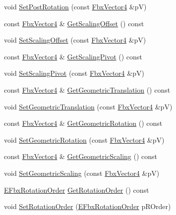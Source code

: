 \begin{DoxyCompactItemize}
void \hyperlink{class_fbx_node_1_1_pivot_a0f017a949fa3460ee06910443c808bbc}{Set\+Post\+Rotation} (const \hyperlink{class_fbx_vector4}{Fbx\+Vector4} \&pV)
\item 
const \hyperlink{class_fbx_vector4}{Fbx\+Vector4} \& \hyperlink{class_fbx_node_1_1_pivot_a9822cb96fdceb2b02e6ac9ba721ceb5c}{Get\+Scaling\+Offset} () const
\item 
void \hyperlink{class_fbx_node_1_1_pivot_a273362006b888000b93d209560b625ff}{Set\+Scaling\+Offset} (const \hyperlink{class_fbx_vector4}{Fbx\+Vector4} \&pV)
\item 
const \hyperlink{class_fbx_vector4}{Fbx\+Vector4} \& \hyperlink{class_fbx_node_1_1_pivot_a82eed97aae88d20e5e56732038514941}{Get\+Scaling\+Pivot} () const
\item 
void \hyperlink{class_fbx_node_1_1_pivot_a176e212079d82a5924f68e3d575c73e4}{Set\+Scaling\+Pivot} (const \hyperlink{class_fbx_vector4}{Fbx\+Vector4} \&pV)
\item 
const \hyperlink{class_fbx_vector4}{Fbx\+Vector4} \& \hyperlink{class_fbx_node_1_1_pivot_a5ef7ba43adfefca3729cde5e54c687fd}{Get\+Geometric\+Translation} () const
\item 
void \hyperlink{class_fbx_node_1_1_pivot_aa0edc14504ff1ea8f6bc611421bb3180}{Set\+Geometric\+Translation} (const \hyperlink{class_fbx_vector4}{Fbx\+Vector4} \&pV)
\item 
const \hyperlink{class_fbx_vector4}{Fbx\+Vector4} \& \hyperlink{class_fbx_node_1_1_pivot_a010ac2796535f1c6aa9df0548129ff29}{Get\+Geometric\+Rotation} () const
\item 
void \hyperlink{class_fbx_node_1_1_pivot_a2dd778bf046aa546e2231e768d564db9}{Set\+Geometric\+Rotation} (const \hyperlink{class_fbx_vector4}{Fbx\+Vector4} \&pV)
\item 
const \hyperlink{class_fbx_vector4}{Fbx\+Vector4} \& \hyperlink{class_fbx_node_1_1_pivot_a613b2b7b073b1f16091c692f3f1f7251}{Get\+Geometric\+Scaling} () const
\item 
void \hyperlink{class_fbx_node_1_1_pivot_afa2b0b729d1f792d6c05a1d935816244}{Set\+Geometric\+Scaling} (const \hyperlink{class_fbx_vector4}{Fbx\+Vector4} \&pV)
\item 
\hyperlink{fbxmath_8h_ae46778666b56bb0abe5992b855fe9332}{E\+Fbx\+Rotation\+Order} \hyperlink{class_fbx_node_1_1_pivot_a14f8b4425c3e20d5f8a05df9cd35abb1}{Get\+Rotation\+Order} () const
\item 
void \hyperlink{class_fbx_node_1_1_pivot_a0ab84ddcb1c5f6e30242c163aafc140c}{Set\+Rotation\+Order} (\hyperlink{fbxmath_8h_ae46778666b56bb0abe5992b855fe9332}{E\+Fbx\+Rotation\+Order} p\+R\+Order)

\end{DoxyCompactItemize}
